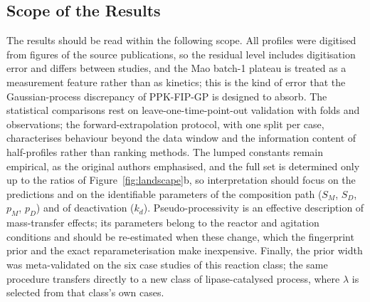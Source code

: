 \subsection{Scope of the Results}
The results should be read within the following scope. All profiles were digitised from figures of the source publications, so the residual level includes digitisation error and differs between studies, and the Mao batch-1 plateau is treated as a measurement feature rather than as kinetics; this is the kind of error that the Gaussian-process discrepancy of PPK-FIP-GP is designed to absorb. The statistical comparisons rest on leave-one-time-point-out validation with \NLotoFolds{} folds and \NFitPoints{} observations; the forward-extrapolation protocol, with one split per case, characterises behaviour beyond the data window and the information content of half-profiles rather than ranking methods. The lumped constants remain empirical, as the original authors emphasised, and the full set is determined only up to the ratios of Figure~\ref{fig:landscape}b, so interpretation should focus on the predictions and on the identifiable parameters of the composition path ($S_M$, $S_D$, $p_M$, $p_D$) and of deactivation ($k_d$). Pseudo-processivity is an effective description of mass-transfer effects; its parameters belong to the reactor and agitation conditions and should be re-estimated when these change, which the fingerprint prior and the exact reparameterisation make inexpensive. Finally, the prior width was meta-validated on the six case studies of this reaction class; the same procedure transfers directly to a new class of lipase-catalysed process, where $\lambda$ is selected from that class's own cases.
